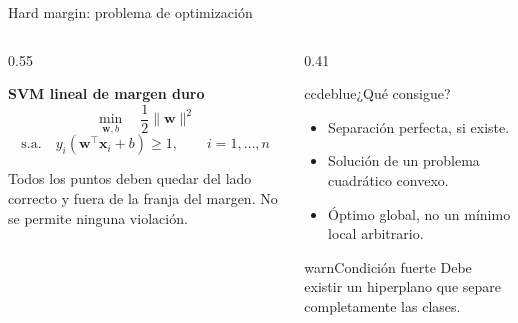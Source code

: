 \begin{frame}{Hard margin: problema de optimización}
\footnotesize
\begin{columns}[T,onlytextwidth]
\begin{column}{0.55\textwidth}
\begin{ccdebox}
\centering
\textbf{SVM lineal de margen duro}
\[
\min_{\mathbf w,b}\quad \frac{1}{2}\|\mathbf w\|^2
\]
\[
\text{s.a.}\quad y_i(\mathbf w^{\top}\mathbf x_i+b)\ge 1,
\qquad i=1,\dots,n
\]
\end{ccdebox}
\vspace{0.15cm}
\begin{keybox}
Todos los puntos deben quedar del lado correcto y fuera de la franja del margen. No se permite ninguna violación.
\end{keybox}
\end{column}
\begin{column}{0.41\textwidth}
\begin{contrastbox}{ccdeblue}{¿Qué consigue?}
\footnotesize
\begin{itemize}
  \item Separación perfecta, si existe.
  \item Solución de un problema cuadrático convexo.
  \item Óptimo global, no un mínimo local arbitrario.
\end{itemize}
\end{contrastbox}
\vspace{0.16cm}
\begin{contrastbox}{warn}{Condición fuerte}
\footnotesize
Debe existir un hiperplano que separe completamente las clases.
\end{contrastbox}
\end{column}
\end{columns}
\end{frame}

